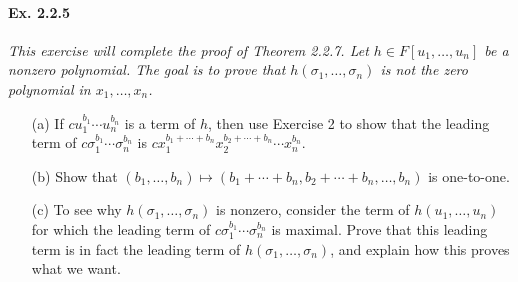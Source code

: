 \documentclass[11pt,a4paper]{article}
\begin{document}
\paragraph{Ex. 2.2.5}

{\it This exercise will complete the proof of Theorem 2.2.7. Let $h \in F[u_1,\ldots,u_n]$ be a nonzero polynomial. The goal is to prove that $h(\sigma_1,\ldots,\sigma_n)$  is not the zero polynomial in $x_1,\ldots,x_n$.
\begin{enumerate}
\item[(a)] If $cu_1^{b_1}\cdots u_n^{b_n}$ is a term of $h$, then use Exercise 2 to show that the leading term of $c\sigma_1^{b_1}\cdots \sigma_n^{b_n}$ is $cx_1^{b_1+\cdots+b_n} x_2^{b_2+\cdots+b_n}\cdots x_n^{b_n}$.
\item[(b)] Show that $(b_1,\ldots,b_n) \mapsto (b_1+\cdots+b_n, b_2+\cdots+b_n, \ldots,b_n)$ is one-to-one.
\item[(c)] To see why $h(\sigma_1,\ldots,\sigma_n)$ is nonzero, consider the term of $h(u_1,\ldots,u_n)$ for which the leading term of $c\sigma_1^{b_1}\cdots\sigma_n^{b_n}$ is maximal. Prove that this leading term is in fact the leading term of $h(\sigma_1,\ldots,\sigma_n)$, and explain how this proves what we want.
\end{enumerate}
}
\end{document}
